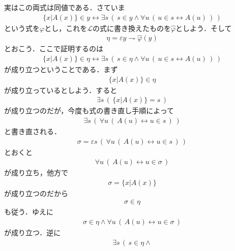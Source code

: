 \documentclass[a4j,10.5pt,oneside,openany]{jsbook}
\begin{document}
\begin{itemize}
			実はこの両式は同値である．さていま
			\begin{align}
				\{x|A(x)\} \in y \leftrightarrow
				\exists s\, \left(\, s \in y \wedge 
				\forall u\, \left(\, u \in s \leftrightarrow A(u)\, \right)\, \right)
			\end{align}
			という式を$\varphi$とし，これを$\mathcal{L}$の式に書き換えたものを$\hat{\varphi}$としよう．そして
			\begin{align}
				\eta = \varepsilon y \rightharpoondown \hat{\varphi}(y)
			\end{align}
			とおこう．ここで証明するのは
			\begin{align}
				\{x|A(x)\} \in \eta \leftrightarrow
				\exists s\, \left(\, s \in \eta \wedge 
				\forall u\, \left(\, u \in s \leftrightarrow A(u)\, \right)\, \right)
			\end{align}
			が成り立つということである．まず
			\begin{align}
				\{x|A(x)\} \in \eta
			\end{align}
			が成り立っているとしよう．すると
			\begin{align}
				\exists s\, \left(\, \{x|A(x)\} = s\, \right)
			\end{align}
			が成り立つのだが，今度も式の書き直し手順によって
			\begin{align}
				\exists s\, \left(\, \forall u\, \left(\, A(u) \leftrightarrow
				u \in s\, \right)\, \right)
			\end{align}
			と書き直される．
			\begin{align}
				\sigma = \varepsilon s\, \left(\, \forall u\, \left(\, A(u) \leftrightarrow
				u \in s\, \right)\, \right)
			\end{align}
			とおくと
			\begin{align}
				\forall u\, \left(\, A(u) \leftrightarrow
				u \in \sigma\, \right)
			\end{align}
			が成り立ち，他方で
			\begin{align}
				\sigma = \{x|A(x)\}
			\end{align}
			が成り立つのだから
			\begin{align}
				\sigma \in \eta
			\end{align}
			も従う．ゆえに
			\begin{align}
				\sigma \in \eta \wedge \forall u\, \left(\, A(u) \leftrightarrow
				u \in \sigma\, \right)
			\end{align}
			が成り立つ．逆に
			\begin{align}
				\exists s\, \left(\, s \in \eta \wedge 

\end{align}
\end{itemize}
\end{document}
